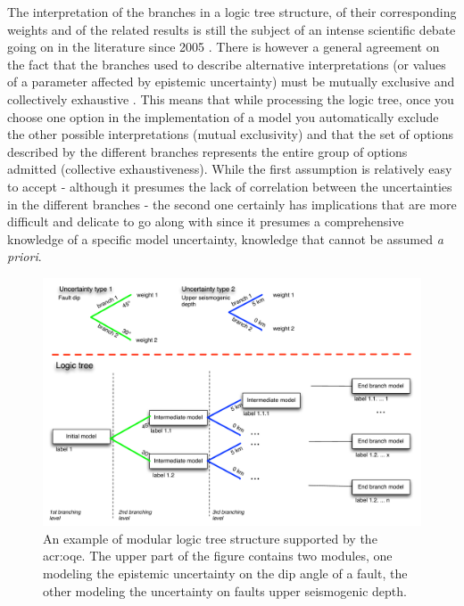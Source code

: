 The interpretation of the branches in a logic tree structure, of their 
corresponding weights and of the related results is still the subject 
of an intense scientific debate going on in the literature since 2005 
\parencite{abrahamson2005,mcguire2005,scherbaum2011,musson2012}.
%
There is however a general agreement on the fact that the branches used to 
describe alternative interpretations (or values of a parameter affected by
epistemic uncertainty) must be mutually exclusive and collectively exhaustive
\parencite{bommer2008}. 
%
This means that while processing the logic tree, once you choose one option 
in the implementation of a model you automatically exclude the other possible 
interpretations (mutual exclusivity) and that the set of options described 
by the different branches represents the entire group of options admitted 
(collective exhaustiveness). 
%
While the first assumption is relatively easy to accept - although it presumes 
the lack of correlation between the uncertainties in the different branches - 
the second one certainly has implications that are more difficult and delicate 
to go along with since it presumes a comprehensive knowledge of a specific 
model uncertainty, knowledge that cannot be assumed \textit{a priori}. 
%
\begin{figure}[!ht]
\includegraphics[width=\textwidth]{./Pictures/lts/logic_tree.pdf}
\caption{An example of modular logic tree structure supported by the
    \gls{acr:oqe}. The upper part of the figure contains two modules, one
    modeling the epistemic uncertainty on the dip angle of a fault, the 
    other modeling the uncertainty on faults upper seismogenic depth.}
\label{fig:logic_tree}
\end{figure}
%
